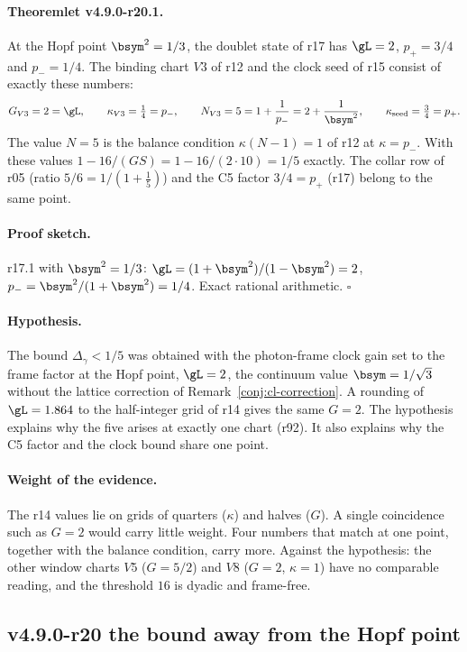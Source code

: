\paragraph{Theoremlet v4.9.0-r20.1.}
At the Hopf point \(\bsym^2=1/3\), the doublet state of r17 has \(\gL=2\), \(p_+=3/4\) and \(p_-=1/4\).  The binding chart \(V3\) of
r12 and the clock seed of r15 consist of exactly these numbers:
\[
G_{V3}=2=\gL,\qquad \kappa_{V3}=\tfrac14=p_-,\qquad
N_{V3}=5=1+\frac1{p_-}=2+\frac1{\bsym^2},\qquad \kappa_{\rm seed}=\tfrac34=p_+ .
\]
The value \(N=5\) is the balance condition \(\kappa(N-1)=1\) of r12 at \(\kappa=p_-\).  With these values
\(1-16/(GS)=1-16/(2\cdot10)=1/5\) exactly.  The collar row of r05 (ratio \(5/6=1/(1+\tfrac15)\)) and the C5 factor \(3/4=p_+\)
(r17) belong to the same point.

\paragraph{Proof sketch.}
r17.1 with \(\bsym^2=1/3\): \(\gL=(1+\bsym^2)/(1-\bsym^2)=2\), \(p_-=\bsym^2/(1+\bsym^2)=1/4\).  Exact rational arithmetic.  \(\square\)

\paragraph{Hypothesis.}
The bound \(\Delta_\gamma<1/5\) was obtained with the photon-frame clock gain set to the frame factor at the Hopf point,
\(\gL=2\), the continuum value \(\bsym=1/\sqrt3\) without the lattice correction of Remark~\ref{conj:cl-correction}.  A rounding
of \(\gL=1.864\) to the half-integer grid of r14 gives the same \(G=2\).  The hypothesis explains why the five arises at
exactly one chart (r92).  It also explains why the C5 factor and the clock bound share one point.

\paragraph{Weight of the evidence.}
The r14 values lie on grids of quarters (\(\kappa\)) and halves (\(G\)).  A single coincidence such as \(G=2\) would carry little
weight.  Four numbers that match at one point, together with the balance condition, carry more.  Against the hypothesis:
the other window charts \(V5\) (\(G=5/2\)) and \(V8\) (\(G=2\), \(\kappa=1\)) have no comparable reading, and the threshold \(16\) is
dyadic and frame-free.

\subsection*{v4.9.0-r20 the bound away from the Hopf point}
\label{subsec:v490-r20-away}

